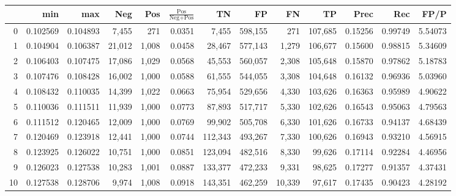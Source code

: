 \begin{tabular}{rrrrrrrrrrrrr}
\toprule
{} &       min &       max &     Neg &    Pos & $\frac{\text{Pos}}{\text{Neg}+\text{Pos}}$ &       TN &       FP &       FN &       TP &     Prec &      Rec &     FP/P \\
\midrule
0   &  0.102569 &  0.104893 &   7,455 &    271 &                                     0.0351 &    7,455 &  598,155 &      271 &  107,685 &  0.15256 &  0.99749 &  5.54073 \\
1   &  0.104904 &  0.106387 &  21,012 &  1,008 &                                     0.0458 &   28,467 &  577,143 &    1,279 &  106,677 &  0.15600 &  0.98815 &  5.34609 \\
2   &  0.106403 &  0.107475 &  17,086 &  1,029 &                                     0.0568 &   45,553 &  560,057 &    2,308 &  105,648 &  0.15870 &  0.97862 &  5.18783 \\
3   &  0.107476 &  0.108428 &  16,002 &  1,000 &                                     0.0588 &   61,555 &  544,055 &    3,308 &  104,648 &  0.16132 &  0.96936 &  5.03960 \\
4   &  0.108432 &  0.110035 &  14,399 &  1,022 &                                     0.0663 &   75,954 &  529,656 &    4,330 &  103,626 &  0.16363 &  0.95989 &  4.90622 \\
5   &  0.110036 &  0.111511 &  11,939 &  1,000 &                                     0.0773 &   87,893 &  517,717 &    5,330 &  102,626 &  0.16543 &  0.95063 &  4.79563 \\
6   &  0.111512 &  0.120465 &  12,009 &  1,000 &                                     0.0769 &   99,902 &  505,708 &    6,330 &  101,626 &  0.16733 &  0.94137 &  4.68439 \\
7   &  0.120469 &  0.123918 &  12,441 &  1,000 &                                     0.0744 &  112,343 &  493,267 &    7,330 &  100,626 &  0.16943 &  0.93210 &  4.56915 \\
8   &  0.123925 &  0.126022 &  10,751 &  1,000 &                                     0.0851 &  123,094 &  482,516 &    8,330 &   99,626 &  0.17114 &  0.92284 &  4.46956 \\
9   &  0.126023 &  0.127538 &  10,283 &  1,001 &                                     0.0887 &  133,377 &  472,233 &    9,331 &   98,625 &  0.17277 &  0.91357 &  4.37431 \\
10  &  0.127538 &  0.128706 &   9,974 &  1,008 &                                     0.0918 &  143,351 &  462,259 &   10,339 &   97,617 &  0.17435 &  0.90423 &  4.28192 \\

\end{tabular}
